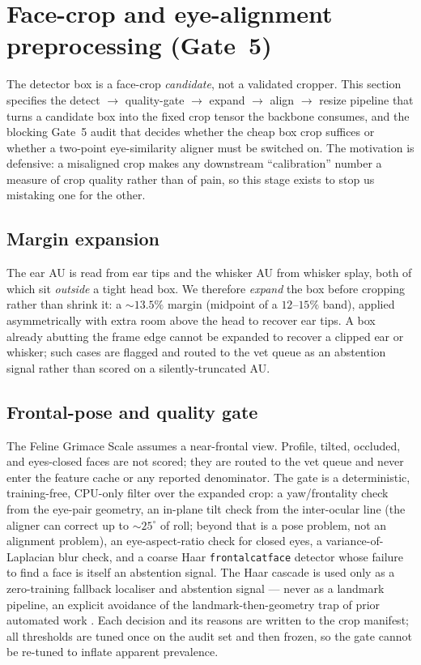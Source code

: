 \section{Face-crop and eye-alignment preprocessing (Gate~5)}
\label{sec:eng-crop}

The detector box is a face-crop \emph{candidate}, not a validated cropper. This
section specifies the detect $\rightarrow$ quality-gate $\rightarrow$ expand
$\rightarrow$ align $\rightarrow$ resize pipeline that turns a candidate box
into the fixed crop tensor the backbone consumes, and the blocking Gate~5 audit
that decides whether the cheap box crop suffices or whether a two-point
eye-similarity aligner must be switched on. The motivation is defensive: a
misaligned crop makes any downstream ``calibration'' number a measure of crop
quality rather than of pain, so this stage exists to stop us mistaking one for
the other.

\subsection{Margin expansion}
\label{sec:eng-crop-expand}

The ear AU is read from ear tips and the whisker AU from whisker splay, both of
which sit \emph{outside} a tight head box. We therefore \emph{expand} the box
before cropping rather than shrink it: a $\sim 13.5\%$ margin (midpoint of a
$12$--$15\%$ band), applied asymmetrically with extra room above the head to
recover ear tips. A box already abutting the frame edge cannot be expanded to
recover a clipped ear or whisker; such cases are flagged and routed to the vet
queue as an abstention signal rather than scored on a silently-truncated AU.

\subsection{Frontal-pose and quality gate}
\label{sec:eng-crop-quality}

The Feline Grimace Scale assumes a near-frontal view. Profile, tilted,
occluded, and eyes-closed faces are not scored; they are routed to the vet
queue and never enter the feature cache or any reported denominator. The gate is
a deterministic, training-free, CPU-only filter over the expanded crop: a
yaw/frontality check from the eye-pair geometry, an in-plane tilt check from the
inter-ocular line (the aligner can correct up to $\sim 25^{\circ}$ of roll;
beyond that is a pose problem, not an alignment problem), an eye-aspect-ratio
check for closed eyes, a variance-of-Laplacian blur check, and a coarse Haar
\texttt{frontalcatface} detector whose failure to find a face is itself an
abstention signal. The Haar cascade is used only as a zero-training fallback
localiser and abstention signal --- never as a landmark pipeline, an explicit
avoidance of the landmark-then-geometry trap of prior automated work
\citep{steagall2023}. Each decision and its reasons are written to the crop
manifest; all thresholds are tuned once on the audit set and then frozen, so the
gate cannot be re-tuned to inflate apparent prevalence.

